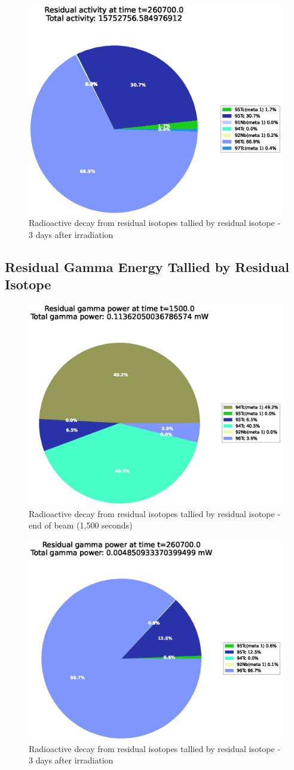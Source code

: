 \begin{figure}[htb]
\centering
\includegraphics[width=0.5\linewidth]{chapters/results_activity_code/mo-john-hewett/thick/residual-activity/0400_260700.eps}
\caption{Radioactive decay from residual isotopes tallied by residual isotope - 3 days after irradiation}
\label{fig:moresidualisotopes3days}
\end{figure}



\subsection{Residual Gamma Energy Tallied by Residual Isotope}

\begin{figure}[htb]
\centering
\includegraphics[width=0.5\linewidth]{chapters/results_activity_code/mo-john-hewett/thick/residual-gamma-energy/0100_1500.eps}
\caption{Radioactive decay from residual isotopes tallied by residual isotope - end of beam (1,500 seconds)}
\label{fig:moresidualenergy1500s}
\end{figure}

\begin{figure}[htb]
\centering
\includegraphics[width=0.5\linewidth]{chapters/results_activity_code/mo-john-hewett/thick/residual-gamma-energy/0400_260700.eps}
\caption{Radioactive decay from residual isotopes tallied by residual isotope - 3 days after irradiation}
\label{fig:moresidualenergy3days}
\end{figure}



